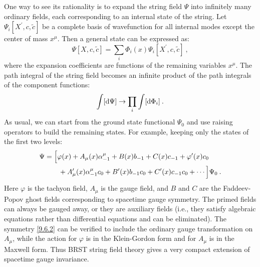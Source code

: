 One way to see its rationality is to expand the string field $\Psi$ into infinitely many ordinary fields, each corresponding to an internal state of the string.
Let $\Psi_{i}[X^{\prime}, c, \tilde{c}]$ be a complete basis of wavefunction for all internal modes except the center of mass $x^{\mu}$. Then a general state can be expressed as:
\begin{equation}
	\Psi[X, c, \tilde{c}]=\sum_{i} \Phi_{i}(x) \Psi_{i}[X^{\prime}, c, \tilde{c}] \:, \label{9.6.5}
\end{equation}
where the expansion coefficients are functions of the remaining variables $x^{\mu}$.
The path integral of the string field becomes an infinite product of the path integrals of the component functions:
\begin{equation}
	\int[\mathrm{d} \Psi] \rightarrow \prod_{i} \int[\mathrm{d} \Phi_{i}] \:. \label{9.6.6}
\end{equation}
As usual, we can start from the ground state functional $\Psi_{0}$ and use raising operators to build the remaining states.
For example, keeping only the states of the first two levels:
\begin{align}
	\Psi &= \Bigl[\varphi(x) + A_{\mu}(x) \alpha_{-1}^{\mu} + B(x) b_{-1} + C(x) c_{-1} + \varphi^{\prime}(x) c_{0}\nonumber \\
	&\qquad+A_{\mu}^{\prime}(x) \alpha_{-1}^{\mu} c_{0} + B^{\prime}(x) b_{-1} c_{0} + C^{\prime}(x) c_{-1} c_{0} + \cdots\Bigr] 
	\Psi_{0} \:.
	\label{9.6.7}
\end{align}
Here $\varphi$ is the tachyon field, $A_{\mu}$ is the gauge field, and $B$ and $C$ are the Faddeev-Popov ghost fields corresponding to spacetime gauge symmetry. 
The primed fields can always be gauged away, or they are auxiliary fields (i.e., they satisfy algebraic equations rather than differential equations and can be eliminated). 
The symmetry \eqref{9.6.2} can be verified to include the ordinary gauge transformation on $A_{\mu}$, while the action for $\varphi$ is in the Klein-Gordon form and for $A_{\mu}$ is in the Maxwell form. 
Thus BRST string field theory gives a very compact extension of spacetime gauge invariance.
